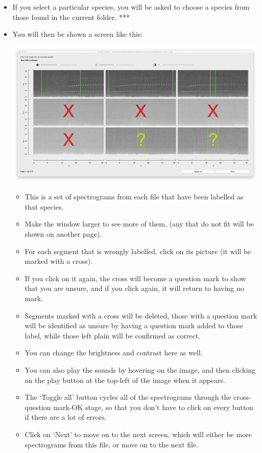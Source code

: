 \documentclass{article}
\begin{document}
\begin{itemize}
\item If you select a particular species, you will be asked to choose a species from those found in the current folder. ***
\item You will then be shown a screen like this:
\begin{center}
	\includegraphics[width=.4\textwidth]{Figures/BatchReview2}
\end{center}

\begin{itemize}
\item This is a set of spectrograms from each file that have been labelled as that species. 
\item Make the window larger to see more of them, (any that do not fit will be shown on another page). 
\item For each segment that is wrongly labelled, click on its picture (it will be marked with a cross). 
\item If you click on it again, the cross will become a question mark to show that you are unsure, and if you click again, it will return to having no mark. 
\item Segments marked with a cross will be deleted, those with a question mark will be identified as unsure by having a question mark added to those label, while those left plain will be confirmed as correct. 
\item You can change the brightness and contrast here as well.
\item You can also play the sounds by hovering on the image, and then clicking on the play button at the top-left of the image when it appears. 
\item The `Toggle all' button cycles all of the spectrograms through the cross-question mark-OK stage, so that you don't have to click on every button if there are a lot of errors. 
\item Click on `Next' to move on to the next screen, which will either be more spectrograms from this file, or move on to the next file. 
\end{itemize}

\end{itemize}
\end{document}
